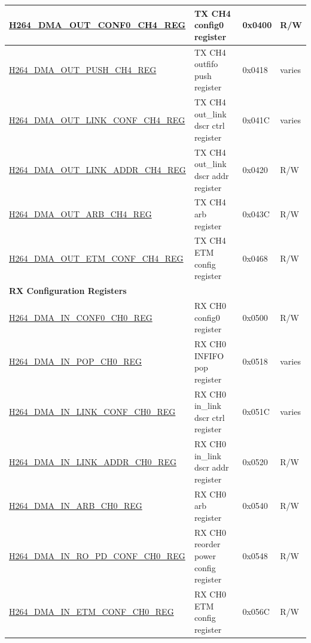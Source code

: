 \begin{longtable}{ | p{7.5cm} | p{5.7cm} | p{1.2cm} | p{1cm} | }
    \hyperref[regdesc:H264DMAOUTCONF0CH4REG]{H264\_DMA\_OUT\_CONF0\_CH4\_REG} & TX CH4 config0 register & 0x0400 & R/W \\ \hline
    \hyperref[regdesc:H264DMAOUTPUSHCH4REG]{H264\_DMA\_OUT\_PUSH\_CH4\_REG} & TX CH4 outfifo push register & 0x0418 & varies \\ \hline
    \hyperref[regdesc:H264DMAOUTLINKCONFCH4REG]{H264\_DMA\_OUT\_LINK\_CONF\_CH4\_REG} & TX CH4 out\_link dscr ctrl register & 0x041C & varies \\ \hline
    \hyperref[regdesc:H264DMAOUTLINKADDRCH4REG]{H264\_DMA\_OUT\_LINK\_ADDR\_CH4\_REG} & TX CH4 out\_link dscr addr register & 0x0420 & R/W \\ \hline
    \hyperref[regdesc:H264DMAOUTARBCH4REG]{H264\_DMA\_OUT\_ARB\_CH4\_REG} & TX CH4 arb register & 0x043C & R/W \\ \hline
    \hyperref[regdesc:H264DMAOUTETMCONFCH4REG]{H264\_DMA\_OUT\_ETM\_CONF\_CH4\_REG} & TX CH4 ETM config register & 0x0468 & R/W \\ \hline
    
    \multicolumn{4}{|l|}{\textbf{RX Configuration Registers}} \\ \hline
    \hyperref[regdesc:H264DMAINCONF0CH0REG]{H264\_DMA\_IN\_CONF0\_CH0\_REG} & RX CH0 config0 register & 0x0500 & R/W \\ \hline
    \hyperref[regdesc:H264DMAINPOPCH0REG]{H264\_DMA\_IN\_POP\_CH0\_REG} & RX CH0 INFIFO pop register & 0x0518 & varies \\ \hline
    \hyperref[regdesc:H264DMAINLINKCONFCH0REG]{H264\_DMA\_IN\_LINK\_CONF\_CH0\_REG} & RX CH0 in\_link dscr ctrl register & 0x051C & varies \\ \hline
    \hyperref[regdesc:H264DMAINLINKADDRCH0REG]{H264\_DMA\_IN\_LINK\_ADDR\_CH0\_REG} & RX CH0 in\_link dscr addr register & 0x0520 & R/W \\ \hline
    \hyperref[regdesc:H264DMAINARBCH0REG]{H264\_DMA\_IN\_ARB\_CH0\_REG} & RX CH0 arb register & 0x0540 & R/W \\ \hline
    \hyperref[regdesc:H264DMAINROPDCONFCH0REG]{H264\_DMA\_IN\_RO\_PD\_CONF\_CH0\_REG} & RX CH0 reorder power config register & 0x0548 & R/W \\ \hline
    \hyperref[regdesc:H264DMAINETMCONFCH0REG]{H264\_DMA\_IN\_ETM\_CONF\_CH0\_REG} & RX CH0 ETM config register & 0x056C & R/W \\ \hline
    

\end{longtable}
